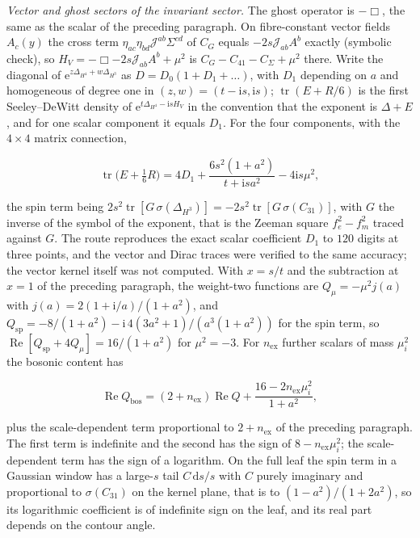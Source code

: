 \emph{Vector and ghost sectors of the invariant sector.} The ghost operator is \(-\Box\), the same as the scalar of the preceding paragraph. On fibre-constant vector fields \(A_c(y)\) the cross term \(\eta_{ac}\eta_{bd}\mathcal J^{ab}\Sigma^{cd}\) of \(C_G\) equals \(-2s\mathcal J_{ab}A^b\) exactly (symbolic check), so \(H_V=-\Box-2s\mathcal J_{ab}A^b+\mu^2\) is \(C_G-C_{41}-C_\Sigma+\mu^2\) there. Write the diagonal of \(\mathrm e^{z\Delta_{H^4}+w\Delta_{H^3}}\) as \(D=D_0(1+D_1+\dots)\), with \(D_1\) depending on \(a\) and homogeneous of degree one in \((z,w)=(t-\mathrm is,\mathrm is)\); \(\operatorname{tr}(E+R/6)\) is the first Seeley--DeWitt density of \(\mathrm e^{t\Delta_{H^4}-\mathrm isH_V}\) in the convention that the exponent is \(\Delta+E\), and for one scalar component it equals \(D_1\). For the four components, with the \(4\times4\) matrix connection,

\[

  \operatorname{tr}\bigl(E+\tfrac16R\bigr)=4D_1+\frac{6s^2(1+a^2)}{t+\mathrm isa^2}-4\mathrm is\mu^2 ,

\]

the spin term being \(2s^2\operatorname{tr}[G\,\sigma(\Delta_{H^3})]=-2s^2\operatorname{tr}[G\,\sigma(C_{31})]\), with \(G\) the inverse of the symbol of the exponent, that is the Zeeman square \(f_e^2-f_m^2\) traced against \(G\). The route reproduces the exact scalar coefficient \(D_1\) to \(120\) digits at three points, and the vector and Dirac traces were verified to the same accuracy; the vector kernel itself was not computed. With \(x=s/t\) and the subtraction at \(x=1\) of the preceding paragraph, the weight-two functions are \(Q_\mu=-\mu^2j(a)\) with \(j(a)=2(1+\mathrm i/a)/(1+a^2)\), and \(Q_{\mathrm{sp}}=-8/(1+a^2)-\mathrm i\,4(3a^2+1)/(a^3(1+a^2))\) for the spin term, so \(\operatorname{Re}[Q_{\mathrm{sp}}+4Q_{\mu}]=16/(1+a^2)\) for \(\mu^2=-3\). For \(n_{\mathrm{ex}}\) further scalars of mass \(\mu_i^2\) the bosonic content has

\[

  \operatorname{Re}Q_{\mathrm{bos}}=(2+n_{\mathrm{ex}})\operatorname{Re}Q+\frac{16-2n_{\mathrm{ex}}\mu_i^2}{1+a^2},

\]

plus the scale-dependent term proportional to \(2+n_{\mathrm{ex}}\) of the preceding paragraph. The first term is indefinite and the second has the sign of \(8-n_{\mathrm{ex}}\mu_i^2\); the scale-dependent term has the sign of a logarithm. On the full leaf the spin term in a Gaussian window has a large-\(s\) tail \(C\,\mathrm ds/s\) with \(C\) purely imaginary and proportional to \(\sigma(C_{31})\) on the kernel plane, that is to \((1-a^2)/(1+2a^2)\), so its logarithmic coefficient is of indefinite sign on the leaf, and its real part depends on the contour angle.



